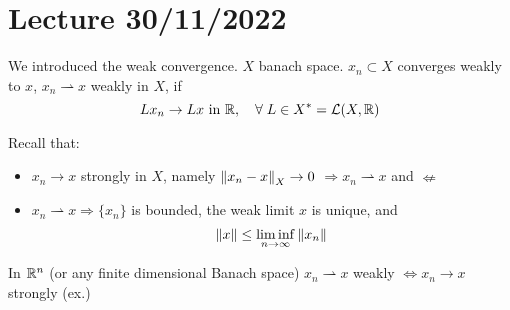 \section{Lecture 30/11/2022}

We introduced the weak convergence. \(X\) banach space. \({x_n} \subset X\) converges weakly to \(x\), \(x_n \rightharpoonup x\) weakly in \(X\), if 
\[
    L x_n \to Lx \text { in } \mathbb{R}, \quad \forall\; L \in X^* = \mathcal{L}(X, \mathbb{R})
\]

Recall that: 
\begin{itemize}
    \item \(x_n \to x \) strongly in \(X\), namely \(\norm{x_n - x}_X \to 0\) \(\Rightarrow x_n \rightharpoonup x\) and \(\nLeftarrow\)
    \item \(x_n \rightharpoonup x \Rightarrow \{x_n\}\) is bounded, the weak limit \(x\) is unique, and 
    \[
        \norm{x} \leq \liminf _{n \to \infty} \norm{x_n}
    \]
\end{itemize}

\begin{remark}
    In \(\mathbb{R}^n\) (or any finite dimensional Banach space) \(x_n \rightharpoonup x\) weakly \(\iff x_n \to x\) strongly (ex.)
\end{remark}

